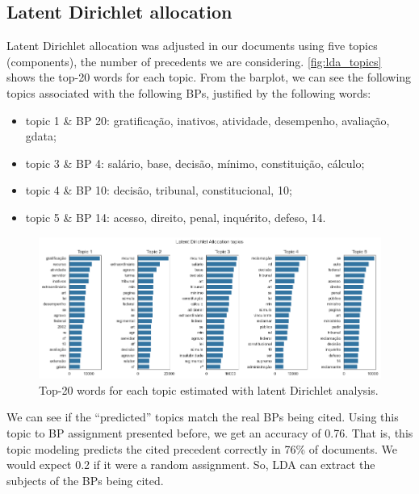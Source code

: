 \documentclass[twocolumn]{article}
\begin{document}
            \subsection{Latent Dirichlet allocation}

                  Latent Dirichlet allocation was adjusted in our documents using five topics (components), the number of precedents we are considering. \autoref{fig:lda_topics} shows the top-20 words for each topic. From the barplot, we can see the following topics associated with the following BPs, justified by the following words:
                  \begin{itemize}
                        \item topic 1 \& BP 20: gratificação, inativos, atividade, desempenho, avaliação, gdata;
                        \item topic 3 \& BP 4: salário, base, decisão, mínimo, constituição, cálculo;
                        \item topic 4 \& BP 10: decisão, tribunal, constitucional, 10;
                        \item topic 5 \& BP 14: acesso, direito, penal, inquérito, defeso, 14.
                  \end{itemize}

                  \begin{figure}[!h]
                        \includegraphics[width=\linewidth]{lda_topics.png}
                        \caption{Top-20 words for each topic estimated with latent Dirichlet analysis.}
                        \label{fig:lda_topics}
                  \end{figure}

                  We can see if the ``predicted'' topics match the real BPs being cited. Using this topic to BP assignment presented before, we get an accuracy of 0.76. That is, this topic modeling predicts the cited precedent correctly in 76\% of documents. We would expect 0.2 if it were a random assignment. So, LDA can extract the subjects of the BPs being cited.
\end{document}
